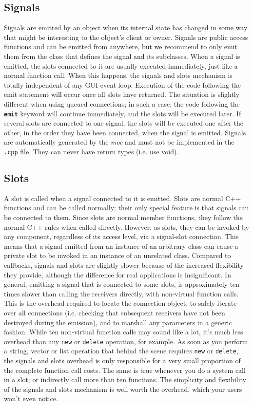 \subsection{Signals}
\label{ssec:soft-signal}
Signals are emitted by an object when its internal state has changed in some way
that might be interesting to the object's client or owner. Signals are public
access functions and can be emitted from anywhere, but we recommend to only emit
them from the class that defines the signal and its subclasses.
%
When a signal is emitted, the slots connected to it are usually executed
immediately, just like a normal function call. When this happens, the signals
and slots mechanism is totally independent of any GUI event loop. Execution of
the code following the emit statement will occur once all slots have returned.
The situation is slightly different when using queued connections; in such a
case, the code following the \textbf{\texttt{emit}} keyword will continue
immediately, and the slots will be executed later.
%
If several slots are connected to one signal, the slots will be executed one
after the other, in the order they have been connected, when the signal is
emitted.
%
Signals are automatically generated by the \emph{moc} and must not be implemented in
the \texttt{.cpp} file. They can never have return types (i.e. use void).\cite{Qt:signal-slot}

\subsection{Slots}
\label{ssec:soft-slots}
A slot is called when a signal connected to it is emitted. Slots are normal C++
functions and can be called normally; their only special feature is that signals
can be connected to them.
%
Since slots are normal member functions, they follow the normal C++ rules when
called directly. However, as slots, they can be invoked by any component,
regardless of its access level, via a signal-slot connection. This means that a
signal emitted from an instance of an arbitrary class can cause a private slot
to be invoked in an instance of an unrelated class.
%
Compared to callbacks, signals and slots are slightly slower because of the
increased flexibility they provide, although the difference for real
applications is insignificant. In general, emitting a signal that is connected
to some slots, is approximately ten times slower than calling the receivers
directly, with non-virtual function calls. This is the overhead required to
locate the connection object, to safely iterate over all connections (i.e.
checking that subsequent receivers have not been destroyed during the emission),
and to marshall any parameters in a generic fashion. While ten non-virtual
function calls may sound like a lot, it's much less overhead than any
\texttt{new} or \texttt{delete} operation, for example. As soon as you perform a
string, vector or list operation that behind the scene requires \texttt{new} or
\texttt{delete}, the signals and slots overhead is only responsible for a very
small proportion of the complete function call costs. The same is true whenever
you do a system call in a slot; or indirectly call more than ten functions. The
simplicity and flexibility of the signals and slots mechanism is well worth the
overhead, which your users won't even notice.\cite{Qt:signal-slot}
